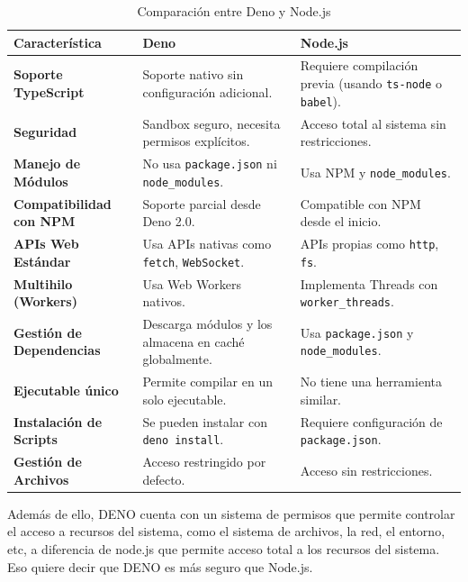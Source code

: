 \documentclass[12pt]{article}
\begin{document}
\begin{table}[h]
    \centering
    \begin{tabular}{|l|l|l|}
        \hline
        \textbf{Característica} & \textbf{Deno} & \textbf{Node.js} \\
        \hline
        \textbf{Soporte TypeScript} & Soporte nativo sin configuración adicional. & Requiere compilación previa (usando \texttt{ts-node} o \texttt{babel}). \\
        \hline
        \textbf{Seguridad} & Sandbox seguro, necesita permisos explícitos. & Acceso total al sistema sin restricciones. \\
        \hline
        \textbf{Manejo de Módulos} & No usa \texttt{package.json} ni \texttt{node\_modules}. & Usa NPM y \texttt{node\_modules}. \\
        \hline
        \textbf{Compatibilidad con NPM} & Soporte parcial desde Deno 2.0. & Compatible con NPM desde el inicio. \\
        \hline
        \textbf{APIs Web Estándar} & Usa APIs nativas como \texttt{fetch}, \texttt{WebSocket}. & APIs propias como \texttt{http}, \texttt{fs}. \\
        \hline
        \textbf{Multihilo (Workers)} & Usa Web Workers nativos. & Implementa Threads con \texttt{worker\_threads}. \\
        \hline
        \textbf{Gestión de Dependencias} & Descarga módulos y los almacena en caché globalmente. & Usa \texttt{package.json} y \texttt{node\_modules}. \\
        \hline
        \textbf{Ejecutable único} & Permite compilar en un solo ejecutable. & No tiene una herramienta similar. \\
        \hline
        \textbf{Instalación de Scripts} & Se pueden instalar con \texttt{deno install}. & Requiere configuración de \texttt{package.json}. \\
        \hline
        \textbf{Gestión de Archivos} & Acceso restringido por defecto. & Acceso sin restricciones. \\
        \hline
    \end{tabular}
    \caption{Comparación entre Deno y Node.js}
\end{table}

\noindent
Además de ello, DENO cuenta con un sistema de permisos que permite controlar el acceso a recursos del sistema, como el sistema de archivos, la red, el entorno, etc, a diferencia de node.js que permite acceso total a los recursos del sistema. Eso quiere decir que DENO es más seguro que Node.js.
\end{document}
